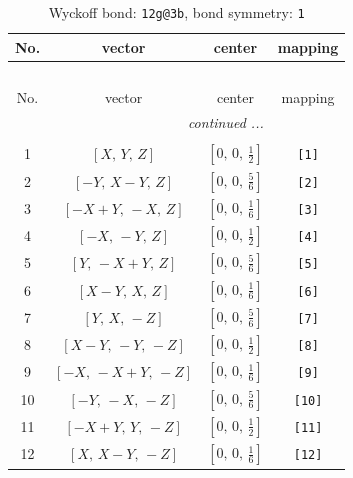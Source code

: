 \documentclass[fleqn,8pt]{jsarticle}
\begin{document}
\begin{longtable}{cccc}
\caption{Wyckoff bond: {\tt 12g@3b}, bond symmetry: {\tt 1}}
 \\
 \hline \hline
No. & vector & center & mapping \\ \hline \endfirsthead

\multicolumn{3}{l}{\tablename\ \thetable{}} \\
 \hline \hline
No. & vector & center & mapping \\ \hline \endhead

 \hline \hline
\multicolumn{3}{r}{\footnotesize\it continued ...} \\ \endfoot

 \hline \hline
\multicolumn{3}{r}{} \\ \endlastfoot

1 & $\left[ X,\, Y,\, Z \right]$ & $\left[ 0,\, 0,\, \frac{1}{2} \right]$ & {\tt [1]} \\ \hline
2 & $\left[ - Y,\, X - Y,\, Z \right]$ & $\left[ 0,\, 0,\, \frac{5}{6} \right]$ & {\tt [2]} \\ \hline
3 & $\left[ - X + Y,\, - X,\, Z \right]$ & $\left[ 0,\, 0,\, \frac{1}{6} \right]$ & {\tt [3]} \\ \hline
4 & $\left[ - X,\, - Y,\, Z \right]$ & $\left[ 0,\, 0,\, \frac{1}{2} \right]$ & {\tt [4]} \\ \hline
5 & $\left[ Y,\, - X + Y,\, Z \right]$ & $\left[ 0,\, 0,\, \frac{5}{6} \right]$ & {\tt [5]} \\ \hline
6 & $\left[ X - Y,\, X,\, Z \right]$ & $\left[ 0,\, 0,\, \frac{1}{6} \right]$ & {\tt [6]} \\ \hline
7 & $\left[ Y,\, X,\, - Z \right]$ & $\left[ 0,\, 0,\, \frac{5}{6} \right]$ & {\tt [7]} \\ \hline
8 & $\left[ X - Y,\, - Y,\, - Z \right]$ & $\left[ 0,\, 0,\, \frac{1}{2} \right]$ & {\tt [8]} \\ \hline
9 & $\left[ - X,\, - X + Y,\, - Z \right]$ & $\left[ 0,\, 0,\, \frac{1}{6} \right]$ & {\tt [9]} \\ \hline
10 & $\left[ - Y,\, - X,\, - Z \right]$ & $\left[ 0,\, 0,\, \frac{5}{6} \right]$ & {\tt [10]} \\ \hline
11 & $\left[ - X + Y,\, Y,\, - Z \right]$ & $\left[ 0,\, 0,\, \frac{1}{2} \right]$ & {\tt [11]} \\ \hline
12 & $\left[ X,\, X - Y,\, - Z \right]$ & $\left[ 0,\, 0,\, \frac{1}{6} \right]$ & {\tt [12]} \\
\end{longtable}
\end{document}
